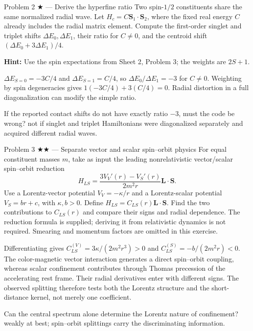 \documentclass[11pt]{article}
\begin{document}
\begin{problem}{Problem 2 ★ — Derive the hyperfine ratio}
Two spin-$1/2$ constituents share the same normalized radial wave.
Let $H_c=C\bm S_1\cdot\bm S_2$, where the fixed real energy $C$ already
includes the radial matrix element. Compute the first-order singlet and
triplet shifts $\Delta E_0,\Delta E_1$, their ratio for $C\ne0$, and the
centroid shift $(\Delta E_0+3\Delta E_1)/4$.

\textbf{Hint:} Use the spin expectations from Sheet 2, Problem 3;
the weights are $2S+1$.
\end{problem}
\begin{solution}
$\Delta E_{S=0}=-3C/4$ and $\Delta E_{S=1}=C/4$,
so $\Delta E_0/\Delta E_1=-3$ for $C\ne0$. Weighting by spin
degeneracies gives $1(-3C/4)+3(C/4)=0$. Radial distortion in a full
diagonalization can modify the simple ratio.
\end{solution}
\begin{quiz}
If the reported contact shifts do not have exactly ratio $-3$, must the code be
wrong? \answer not if singlet and triplet Hamiltonians were diagonalized
separately and acquired different radial waves.
\end{quiz}

\begin{problem}{Problem 3 ★★ — Separate vector and scalar spin--orbit physics}
For equal constituent masses $m$, take as input the leading
nonrelativistic vector/scalar spin--orbit reduction
\[
H_{LS}=\frac{3V_V'(r)-V_S'(r)}{2m^2r}\bm L\cdot\bm S.
\]
Use a Lorentz-vector potential $V_V=-\kappa/r$ and a Lorentz-scalar potential
$V_S=br+c$, with $\kappa,b>0$. Define $H_{LS}=C_{LS}(r)\bm L\cdot\bm S$.
Find the two contributions to $C_{LS}(r)$
and compare their signs and radial dependence. The reduction formula is
supplied; deriving it from relativistic dynamics is not required. Smearing
and momentum factors are omitted in this exercise.
\end{problem}
\begin{solution}
Differentiating gives $C_{LS}^{(V)}=3\kappa/(2m^2r^3)>0$ and
$C_{LS}^{(S)}=-b/(2m^2r)<0$.
The color-magnetic vector interaction generates a direct spin--orbit coupling,
whereas scalar confinement contributes through Thomas precession of the
accelerating rest frame. Their radial derivatives enter with different signs.
The observed splitting therefore tests both the Lorentz structure and the
short-distance kernel, not merely one coefficient.
\end{solution}
\begin{quiz}
Can the central spectrum alone determine the Lorentz nature of confinement?
\answer weakly at best; spin--orbit splittings carry the discriminating
information.
\end{quiz}
\end{document}
